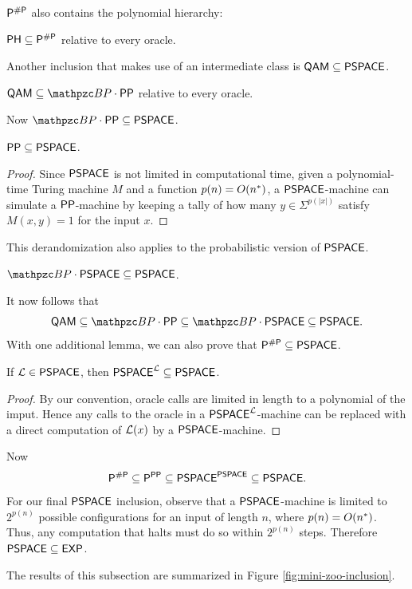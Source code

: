 $\mathsf{P}^{\#\mathsf{P}}$ also contains the polynomial hierarchy:
\begin{theorem}
$\mathsf{PH}\subseteq\mathsf{P}^{\#\mathsf{P}}$ relative to every oracle.
\end{theorem}
Another inclusion that makes use of an intermediate class is 
$\mathsf{QAM}\subseteq\mathsf{PSPACE}$.
\begin{theorem}
$\msf{QAM}\subseteq\cBP\cdot\msf{PP}$ relative to every oracle.
\end{theorem}
Now $\cBP\cdot\msf{PP}\subseteq\msf{PSPACE}$.
\begin{lemma}
$\mathsf{PP}\subseteq\mathsf{PSPACE}$.
\end{lemma}
\begin{proof}
Since $\mathsf{PSPACE}$ is not limited in computational time, given a 
polynomial-time Turing machine $M$ and a function $p(n)=O(n^*)$, a 
$\mathsf{PSPACE}$-machine can simulate a $\mathsf{PP}$-machine by keeping a tally of 
how many $y\in\Sigma^{p(|x|)}$ satisfy $M(x,y)=1$ for the input $x$.
\end{proof}
This derandomization also applies to the probabilistic version of 
$\mathsf{PSPACE}$.
\begin{lemma}
$\cBP\cdot\msf{PSPACE}\subseteq\msf{PSPACE}$.
\end{lemma}
It now follows that
\[
\msf{QAM}\subseteq\cBP\cdot\msf{PP}\subseteq\cBP\cdot\msf{PSPACE}\subseteq
\msf{PSPACE}.
\]
With one additional lemma, we can also prove that 
$\mathsf{P}^{\#\mathsf{P}}\subseteq\mathsf{PSPACE}$.
\begin{lemma}
If $\mathcal{L}\in\mathsf{PSPACE}$, then $\mathsf{PSPACE}^{\mathcal{L}}\subseteq\mathsf{PSPACE}$.
\end{lemma}
\begin{proof}
By our convention, oracle calls are limited in length to a polynomial of the imput.
Hence any calls to the oracle in a $\mathsf{PSPACE}^{\mathcal{L}}$-machine can be replaced with 
a direct computation of $\mathcal{L}(x)$ by a $\mathsf{PSPACE}$-machine.
\end{proof}
Now
\[
\mathsf{P}^{\#\mathsf{P}}\subseteq\mathsf{P}^{\mathsf{PP}}\subseteq\mathsf{PSPACE}^{\mathsf{PSPACE}}\subseteq
\mathsf{PSPACE}.
\]
For our final $\mathsf{PSPACE}$ inclusion, observe that a $\mathsf{PSPACE}$-machine is
limited to $2^{p(n)}$ possible configurations for an input of length $n$, where 
$p(n)=O(n^*)$. Thus, any computation that halts must do so within $2^{p(n)}$ 
steps. Therefore $\mathsf{PSPACE}\subseteq\mathsf{EXP}$.

The results of this subsection are summarized in Figure 
\ref{fig:mini-zoo-inclusion}.

